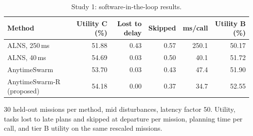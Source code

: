 \begin{table}[t]
\caption{Study 1: software-in-the-loop results.}\label{tab:tierc}
\centering\small
\begin{threeparttable}
\begin{tabular}{lrrrrr}
\toprule
Method & Utility C (\%) & Lost to delay & Skipped & ms/call & Utility B (\%) \\
\midrule
ALNS, 250\,ms & 51.88 & 0.43 & 0.57 & 250.1 & 50.17 \\
ALNS, 40\,ms & 54.69 & 0.03 & 0.50 & 40.1 & 51.72 \\
AnytimeSwarm & 53.70 & 0.03 & 0.43 & 47.4 & 51.90 \\
AnytimeSwarm-R (proposed) & 54.18 & 0.00 & 0.37 & 34.7 & 52.55 \\
\bottomrule
\end{tabular}
\begin{tablenotes}[flushleft]\scriptsize
\item[] 30 held-out missions per method, mid disturbances, latency factor 50. Utility, tasks lost to late plans and skipped at departure per mission, planning time per call, and tier B utility on the same rescaled missions.
\end{tablenotes}
\end{threeparttable}
\end{table}
